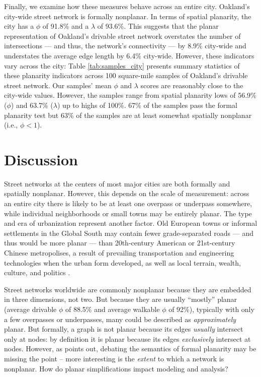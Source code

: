 \documentclass[Afour,sageh,times]{sagej}
\begin{document}
Finally, we examine how these measures behave across an entire city. Oakland's city-wide street network is formally nonplanar. In terms of spatial planarity, the city has a $\phi$ of 91.8\% and a $\lambda$ of 93.6\%. This suggests that the planar representation of Oakland's drivable street network overstates the number of intersections --- and thus, the network's connectivity --- by 8.9\% city-wide and understates the average edge length by 6.4\% city-wide. However, these indicators vary across the city: Table \ref{tab:samples_city} presents summary statistics of these planarity indicators across 100 square-mile samples of Oakland's drivable street network. Our samples' mean $\phi$ and $\lambda$ scores are reasonably close to the city-wide values. However, the samples range from spatial planarity lows of 56.9\% ($\phi$) and 63.7\% ($\lambda$) up to highs of 100\%. 67\% of the samples pass the formal planarity test but 63\% of the samples are at least somewhat spatially nonplanar (i.e., $\phi < 1$).



\section{Discussion}

Street networks at the centers of most major cities are both formally and spatially nonplanar. However, this depends on the scale of measurement: across an entire city there is likely to be at least one overpass or underpass somewhere, while individual neighborhoods or small towns may be entirely planar. The type and era of urbanization represent another factor. Old European towns or informal settlements in the Global South may contain fewer grade-separated roads --- and thus would be more planar --- than 20th-century American or 21st-century Chinese metropolises, a result of prevailing transportation and engineering technologies when the urban form developed, as well as local terrain, wealth, culture, and politics \citep{southworth_street_1995}.

Street networks worldwide are commonly nonplanar because they are embedded in three dimensions, not two. But because they are usually \enquote{mostly} planar (average drivable $\phi$ of 88.5\% and average walkable $\phi$ of 92\%), typically with only a few overpasses or underpasses, many could be described as \emph{approximately} planar. But formally, a graph is not planar because its edges \emph{usually} intersect only at nodes: by definition it is planar because its edges \emph{exclusively} intersect at nodes. However, as \citet{newman_networks:_2010} points out, debating the semantics of formal planarity may be missing the point -- more interesting is the \emph{extent} to which a network is nonplanar. How do planar simplifications impact modeling and analysis?
\end{document}
